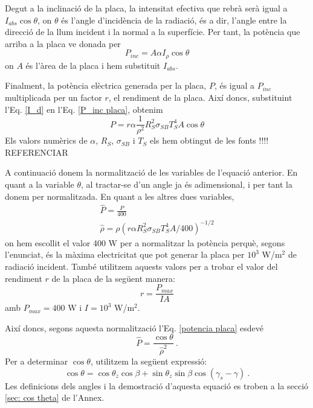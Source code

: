 \documentclass[11pt]{article}
\begin{document}
Degut a la inclinació de la placa, la intensitat efectiva que rebrà serà igual a $I_{abs} \cos{\theta}$, on $\theta$ és l'angle d'incidència de la radiació, és a dir, l'angle entre la direcció de la llum incident i la normal a la superfície. Per tant, la potència que arriba a la placa ve donada per
\begin{equation}
    P_{inc} = A \alpha I_{\rho} \cos{\theta}
    \label{P_inc placa}
\end{equation}
on $A$ és l'àrea de la placa i hem substituit $I_{abs}$.

Finalment, la potència elèctrica generada per la placa, $P$, és igual a $P_{inc}$ multiplicada per un factor $r$, el rendiment de la placa. Així doncs, substituint l'Eq. \eqref{I_d} en l'Eq. \eqref{P_inc placa}, obtenim
\begin{equation}
    P = r \alpha \frac{1}{\rho^2}R_S^2\sigma_{SB}T_S^4A \cos{\theta}
    \label{potencia placa}
\end{equation}
Els valors numèrics de $\alpha$, $R_S$, $\sigma_{SB}$ i $T_S$ els hem obtingut de les fonts !!!! REFERENCIAR

A continuació donem la normalització de les variables de l'equació anterior. En quant a la variable $\theta$, al tractar-se d'un angle ja és adimensional, i per tant la donem per normalitzada. En quant a les altres dues variables,
\begin{align}
    \hat{P}=\frac{P}{400} \label{P normalizada} \\
    \hat{\rho}= \rho \left( r \alpha R_S^2\sigma_{SB}T_S^4A/400 \right)^{-1/2} \label{rho normalizada}
\end{align}
on hem escollit el valor 400 W per a normalitzar la potència perquè, segons l'enunciat, és la màxima electricitat que pot generar la placa per $10^3$ W/$\text{m}^2$ de radiació incident. També utilitzem aquests valors per a trobar el valor del rendiment $r$ de la placa de la següent manera:
\begin{equation}
     r = \frac{P_{max}}{IA}
\end{equation}
amb $P_{max}=400$ W i $I=10^3$ W/$\text{m}^2$.

Així doncs, segons aquesta normalització l'Eq. \eqref{potencia placa} esdevé
\begin{equation}
    \hat{P} = \frac{\cos{\theta}}{\hat{\rho}^2} \ .
    \label{pot norm}
\end{equation}
Per a determinar $\cos{\theta}$, utilitzem la següent expressió:
\begin{equation}
    \cos \theta = \cos \theta_z \cos \beta + \sin \theta_z \sin \beta \cos (\gamma_s - \gamma) \ .
    \label{cos theta}
\end{equation}
Les definicions dels angles i la demostració d'aquesta equació es troben a la secció \ref{sec: cos theta} de l'Annex.
\end{document}
